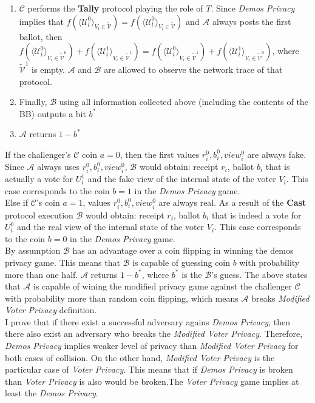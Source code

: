 \begin{enumerate}
\begin{enumerate}
\item $\mathcal{C}$ performs the \textbf{Tally} protocol playing the role of $T$. Since \textit{Demos Privacy} implies that  $f(\langle \mathcal{U}^0_l \rangle _{V_l \in \tilde{\mathcal{V}}} ) = f(\langle \mathcal{U}^0_l \rangle _{V_l \in \tilde{\mathcal{V}}})$ and  $\mathcal{A}$ always posts the first ballot, then  $f(\langle \mathcal{U}^0_i \rangle _{V_i \in \tilde{\mathcal{V}}^0} ) + f(\langle \mathcal{U}^1_i \rangle _{V_i \in \tilde{\mathcal{V}}^1} ) =  f(\langle \mathcal{U}^0_i \rangle _{V_i \in \tilde{\mathcal{V}}^1} ) +  f(\langle \mathcal{U}^1_i \rangle _{V_i \in \tilde{\mathcal{V}}^0} )$, where $\tilde{\mathcal{V}}^1$ is empty.  $\mathcal{A}$ and  $\mathcal{B}$ are allowed to observe the network trace of that protocol. 
\item Finally, $\mathcal{B}$ using all information collected above (including the contents of the BB) outputs a bit $b^*$
\item $\mathcal{A}$ returns $1 - b^*$
 \end{enumerate} 
  \end{enumerate} 
 
If the challenger's  $\mathcal{C}$ coin $a=0$, then the first values $r^0_i,b_i^0,view_i^0$ are always fake. Since $\mathcal{A}$ always uses $r^0_i,b_i^0,view_i^0$, $\mathcal{B}$ would obtain: receipt $r_i$, ballot $b_i$ that is actually a vote for $U^1_i$  and the fake view of the internal state of the voter $V_i$. This case corresponds to the coin $b=1$ in the \textit{Demos Privacy} game. \\

Else if $\mathcal{C}$'s coin $a=1$, values $r^0_i,b_i^0,view_i^0$ are always real. As a result of the \textbf{Cast}  protocol execution $\mathcal{B}$ would obtain: receipt $r_i$, ballot $b_i$ that is indeed a vote for $U^0_i$  and the real view of the internal state of the voter $V_i$. This case corresponds to the coin $b=0$ in the \textit{Demos Privacy} game.\\
 
By assumption $\mathcal{B}$ has an advantage over a coin flipping in winning the demos privacy game. This means that  $\mathcal{B}$ is capable of guessing coin $b$ with probability more than one half.  $\mathcal{A}$ returns $1-b^*$, where $b^*$ is the $\mathcal{B}$'s guess. The above states that $\mathcal{A}$ is capable of wining the modified privacy game against  the challenger $\mathcal{C}$ with probability more than random coin flipping, which means $\mathcal{A}$ breaks \textit{Modified Voter Privacy} definition.\\ 

I prove that if there exist a successful adversary agains \textit{Demos Privacy}, then there also exist an adversary who breaks the \textit{Modified Voter Privacy}. Therefore, \textit{Demos Privacy} implies weaker level of privacy than \textit{Modified Voter Privacy} for both cases of collision. On the other hand, \textit{Modified Voter Privacy} is the particular case of \textit{Voter Privacy}. This means that if \textit{Demos Privacy} is broken than \textit{Voter Privacy} is also would be broken.The \textit{Voter Privacy} game implies at least the \textit{Demos Privacy}.  